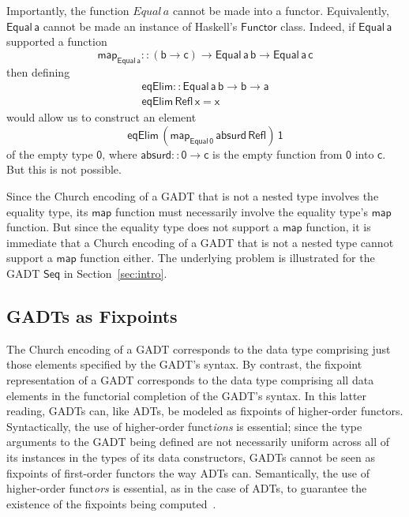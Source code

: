 \documentclass[submission,copyright,creativecommons]{eptcs}
\begin{document}
Importantly, the function $\mathit{Equal}\,a$ cannot be made into a
functor. Equivalently, $\mathsf{Equal\,a}$ cannot be made an instance
of Haskell's $\mathsf{Functor}$ class. Indeed, if $\mathsf{Equal\,a}$
supported a function
\[\mathsf{map_{Equal\,a} :: (b \to c) \to Equal\,a\,b \to
  Equal\,a\,c}\]
then defining
\[\begin{array}{l}
\mathsf{eqElim :: Equal\, a\, b \to b \to a}\\
\mathsf{eqElim\, Refl\, x = x} 
\end{array}\]
would allow us to construct
an element
\[\mathsf{eqElim\, (map_{Equal\,0}\, absurd\, Refl)\, 1}\]
of the empty type $\mathsf{0}$, where $\mathsf{absurd :: 0 \to c}$ is
the
empty function from  $\mathsf{0}$
into
$\mathsf{c}$.
But this is not possible.

Since the Church encoding of a GADT that is not a nested type involves
the equality type, its $\mathsf{map}$ function must necessarily
involve the equality type's $\mathsf{map}$ function. But since the
equality type does not support a $\mathsf{map}$ function,
it is immediate that
a Church encoding of a GADT that is not a nested type cannot
support a $\mathsf{map}$ function either.
The underlying problem is illustrated for the GADT $\mathsf{Seq}$ in
Section~\ref{sec:intro}.

\subsection{GADTs as Fixpoints}\label{sec:prim-gadts}

The Church encoding of a GADT corresponds to the data type comprising
just those elements specified by the GADT's syntax. By contrast, the
fixpoint representation of a GADT corresponds to the data type
comprising all data elements in the functorial completion of the
GADT's syntax. In this latter reading, GADTs can, like ADTs, be
modeled as fixpoints of higher-order functors. Syntactically, the use
of higher-order funct{\em ions} is essential; since the type arguments
to the GADT being defined are not necessarily uniform across all of
its instances in the types of its data constructors, GADTs cannot be
seen as fixpoints of first-order functors the way ADTs
can. Semantically, the use of higher-order funct{\em ors} is
essential, as in the case of ADTs, to guarantee the existence of the
fixpoints being computed~\cite{tfca}.
\end{document}

